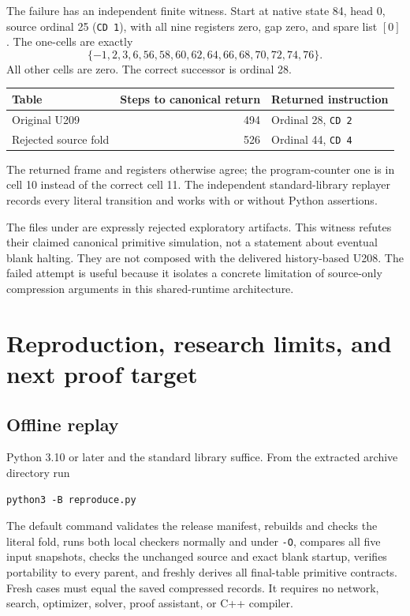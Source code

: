 \documentclass[11pt,letterpaper]{article}
\newcommand{\code}[1]{\texttt{#1}}
\begin{document}
The failure has an independent finite witness. Start at native state 84,
head 0, source ordinal 25 (\code{CD 1}), with all nine registers zero,
gap zero, and spare list $[0]$. The one-cells are exactly
\[
           \{-1,2,3,6,56,58,60,62,64,66,68,70,72,74,76\}.
\]
All other cells are zero. The correct successor is ordinal 28.
\begin{center}
\begin{tabular}{@{}lrl@{}}
\toprule
Table & Steps to canonical return & Returned instruction\\
\midrule
Original U209 & 494 & Ordinal 28, \code{CD 2}\\
Rejected source fold & 526 & Ordinal 44, \code{CD 4}\\
\bottomrule
\end{tabular}
\end{center}
The returned frame and registers otherwise agree; the program-counter
one is in cell 10 instead of the correct cell 11. The independent
standard-library replayer records every literal transition and works
with or without Python assertions.

The files under  are expressly
rejected exploratory artifacts. This witness refutes their claimed
canonical primitive simulation, not a statement about eventual blank
halting. They are not composed with the delivered history-based U208.
The failed attempt is useful because it isolates a concrete limitation
of source-only compression arguments in this shared-runtime architecture.

\section{Reproduction, research limits, and next proof target}
\subsection{Offline replay}
Python 3.10 or later and the standard library suffice. From the extracted
archive directory run
\begin{lstlisting}
python3 -B reproduce.py
\end{lstlisting}
The default command validates the release manifest, rebuilds and checks
the literal fold, runs both local checkers normally and under \code{-O},
compares all five input snapshots, checks the unchanged source and exact
blank startup, verifies portability to every parent, and freshly derives
all final-table primitive contracts. Fresh cases must equal the saved
compressed records. It requires no network, search, optimizer, solver,
proof assistant, or C++ compiler.
\end{document}
